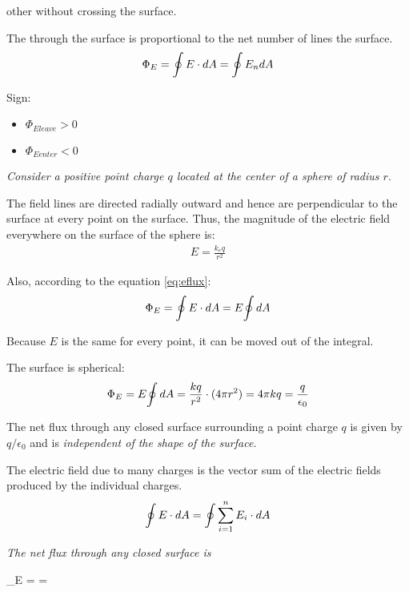         other without crossing the surface.
        \par The  through the surface is proportional to the net number of lines
         the surface.
        \begin{equation} \label{eq:eflux}
            \Phi_{E} = {\oint\limits E \cdot dA} = {\oint\limits E_{n}dA}
        \end{equation}
        \par Sign:
        \begin{itemize}
            \item $\Phi_{E leave} > 0$
            \item $\Phi_{E enter} < 0$
        \end{itemize}

        \par \textit{Consider a positive point charge $q$ located at the center of a sphere of
        radius $r$}.
        \par The field lines are directed radially outward and hence are perpendicular to the
        surface at every point on the surface. Thus, the magnitude of the electric field everywhere
        on the surface of the sphere is:
        \begin{align*}
            E = \frac{k_{e}q}{r^{2}}
        \end{align*}
        \par Also, according to the equation \eqref{eq:eflux}:
        \begin{equation} \label{eq:eflux}
            \Phi_{E} = {\oint\limits E \cdot dA} = E {\oint\limits dA}
        \end{equation}
        \par Because $E$ is the same for every point, it can be moved out of the integral.
        \par The surface is spherical:
        \begin{equation}
            \Phi_{E} = E {\oint\limits dA} = \frac{kq}{r^{2}} \cdot (4 \pi r^{2})
            = 4 \pi kq = \frac{q}{\epsilon_{0}}
        \end{equation}
        \par The net flux through any closed surface surrounding a point charge $q$ is given by
            $q / \epsilon_{0}$ and is \textit{independent of the shape of the surface.}
        \par The electric field due to many charges is the vector sum of the electric fields produced
        by the individual charges.
        \begin{align*}
            {\oint\limits E \cdot dA} = {\oint\limits {\sum\limits _{i = 1}^{n} E_{i}} \cdot dA}
        \end{align*}
        \par \textit{The net flux through any closed surface is}
        \begin{eqbox}
            \Phi_{E} =  = 
        \end{eqbox}
